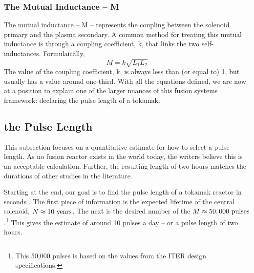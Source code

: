 \subsubsection{The Mutual Inductance -- M}

The mutual inductance -- M -- represents the coupling between the solenoid primary and the plasma secondary. A common method for treating this mutual inductance is through a coupling coefficient, k, that links the two self-inductances. Formulaically,
\begin{equation}
	M = k \sqrt{ L_1 L_2 }
\end{equation}
The value of the coupling coefficient, k, is always less than (or equal to) 1, but usually has a value around one-third. With all the equations defined, we are now at a position to explain one of the larger nuances of this fusion systems framework: declaring the pulse length of a tokamak.

\subsection{ the Pulse Length}

\label{section:pulse}

This subsection focuses on a quantitative estimate for how to select a pulse length. As no fusion reactor exists in the world today, the writers believe this is an acceptable calculation. Further, the resulting length of two hours matches the durations of other studies in the literature.

Starting at the end, our goal is to find the pulse length of a tokamak reactor in seconds .  The first piece of information is the expected lifetime of the central solenoid, $ N \approx 10 \ \textnormal{years} $. The next is the desired number of  the  $ M \approx 50,000 \ \textnormal{pulses} $.\footnote{This 50,000 pulses is based on the values from the ITER design specifications.\cite{iter_cs} } This gives the  estimate of around 10 pulses a day -- or a  pulse length of two hours.

